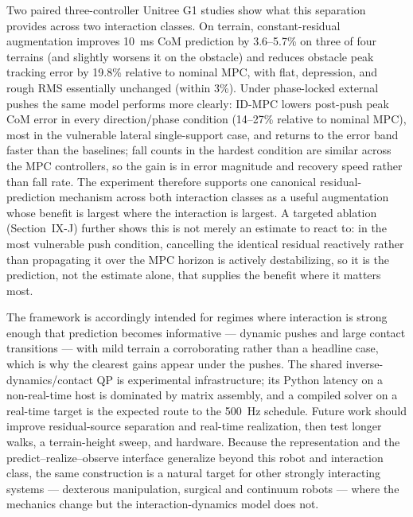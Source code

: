 \documentclass[journal]{IEEEtran}
\theoremstyle{plain}
\theoremstyle{definition}
\theoremstyle{remark}
\begin{document}
Two paired three-controller Unitree G1 studies show what this separation provides across two interaction classes. On terrain, constant-residual augmentation improves 10~ms CoM prediction by 3.6--5.7\% on three of four terrains (and slightly worsens it on the obstacle) and reduces obstacle peak tracking error by 19.8\% relative to nominal MPC, with flat, depression, and rough RMS essentially unchanged (within 3\%). Under phase-locked external pushes the same model performs more clearly: ID-MPC lowers post-push peak CoM error in every direction/phase condition (14--27\% relative to nominal MPC), most in the vulnerable lateral single-support case, and returns to the error band faster than the baselines; fall counts in the hardest condition are similar across the MPC controllers, so the gain is in error magnitude and recovery speed rather than fall rate. The experiment therefore supports one canonical residual-prediction mechanism across both interaction classes as a useful augmentation whose benefit is largest where the interaction is largest. A targeted ablation (Section~IX-J) further shows this is not merely an estimate to react to: in the most vulnerable push condition, cancelling the identical residual reactively rather than propagating it over the MPC horizon is actively destabilizing, so it is the prediction, not the estimate alone, that supplies the benefit where it matters most.

The framework is accordingly intended for regimes where interaction is strong enough that prediction becomes informative --- dynamic pushes and large contact transitions --- with mild terrain a corroborating rather than a headline case, which is why the clearest gains appear under the pushes. The shared inverse-dynamics/contact QP is experimental infrastructure; its Python latency on a non-real-time host is dominated by matrix assembly, and a compiled solver on a real-time target is the expected route to the 500~Hz schedule. Future work should improve residual-source separation and real-time realization, then test longer walks, a terrain-height sweep, and hardware. Because the representation and the predict--realize--observe interface generalize beyond this robot and interaction class, the same construction is a natural target for other strongly interacting systems --- dexterous manipulation, surgical and continuum robots --- where the mechanics change but the interaction-dynamics model does not.
\end{document}

